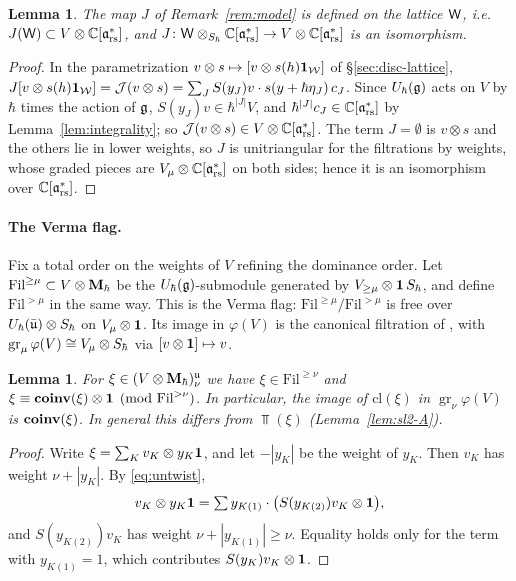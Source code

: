 \documentclass{article}
\theoremstyle{plain}
\newtheorem{lemma}[theorem]{Lemma}
\theoremstyle{definition}
\theoremstyle{remark}
\numberwithin{equation}{section}
\begin{document}
\begin{lemma}\label{lem:J-integral}
The map $J$ of Remark~\ref{rem:model} is defined on the lattice $\mathsf W$, i.e.\ $J(\mathsf W)\subset V\otimes\mathbb{C}[\mathfrak{a}^*_{\mathrm{rs}}]$, and $J\colon\mathsf W\otimes_{S_\hbar}\mathbb{C}[\mathfrak{a}^*_{\mathrm{rs}}]\to V\otimes\mathbb{C}[\mathfrak{a}^*_{\mathrm{rs}}]$ is an isomorphism.
\end{lemma}

\begin{proof}
In the parametrization $v\otimes s\mapsto[v\otimes s(h)\mathbf 1_{\mathcal{W}}]$ of \S\ref{sec:disc-lattice},
$J[v\otimes s(h)\mathbf 1_{\mathcal{W}}]=\mathcal J(v\otimes s)=\sum_JS(y_J)v\cdot s(y+\hbar\eta_J)\,c_J$. Since $U_\hbar(\mathfrak{g})$ acts on $V$ by $\hbar$ times the action of $\mathfrak{g}$, $S(y_J)v\in\hbar^{|J|}V$, and $\hbar^{|J|}c_J\in\mathbb{C}[\mathfrak{a}^*_{\mathrm{rs}}]$ by Lemma~\ref{lem:integrality}; so $\mathcal J(v\otimes s)\in V\otimes\mathbb{C}[\mathfrak{a}^*_{\mathrm{rs}}]$. The term $J=\emptyset$ is $v\otimes s$ and the others lie in lower weights, so $J$ is unitriangular for the filtrations by weights, whose graded pieces are $V_\mu\otimes\mathbb{C}[\mathfrak{a}^*_{\mathrm{rs}}]$ on both sides; hence it is an isomorphism over $\mathbb{C}[\mathfrak{a}^*_{\mathrm{rs}}]$.
\end{proof}

\paragraph{The Verma flag.}
Fix a total order on the weights of $V$ refining the dominance order. Let $\mathrm{Fil}^{\ge\mu}\subset V\otimes\mathbf{M}_\hbar$ be the $U_\hbar(\mathfrak{g})$-submodule generated by $V_{\ge\mu}\otimes\mathbf 1\,S_\hbar$, and define $\mathrm{Fil}^{>\mu}$ in the same way. This is the Verma flag: $\mathrm{Fil}^{\ge\mu}/\mathrm{Fil}^{>\mu}$ is free over $U_\hbar(\bar{\mathfrak u})\otimes S_\hbar$ on $V_\mu\otimes\mathbf 1$. Its image in $\varphi(V)$ is the canonical filtration of \cite[\S4.3, Lemma 6]{bezrukavnikov2026equivariantsatakecategorykostantwhittaker}, with $\operatorname{gr}_\mu\varphi(V)\cong V_\mu\otimes S_\hbar$ via $[v\otimes\mathbf 1]\mapsto v$.

\begin{lemma}\label{lem:flag}
For $\xi\in(V\otimes\mathbf{M}_\hbar)^{\mathfrak{u}}_\nu$ we have $\xi\in\mathrm{Fil}^{\ge\nu}$ and $\xi\equiv\operatorname{\mathbf{coinv}}(\xi)\otimes\mathbf 1\pmod{\mathrm{Fil}^{>\nu}}$. In particular, the image of $\mathrm{cl}(\xi)$ in $\operatorname{gr}_\nu\varphi(V)$ is $\operatorname{\mathbf{coinv}}(\xi)$. In general this differs from $\Top(\xi)$ (Lemma~\ref{lem:sl2-A}).
\end{lemma}

\begin{proof}
Write $\xi=\sum_Kv_K\otimes y_K\mathbf 1$, and let $-|y_K|$ be the weight of $y_K$. Then $v_K$ has weight $\nu+|y_K|$. By \eqref{eq:untwist},
\[
v_K\otimes y_K\mathbf 1=\textstyle\sum y_{K(1)}\cdot\bigl(S(y_{K(2)})v_K\otimes\mathbf 1\bigr),
\]
and $S(y_{K(2)})v_K$ has weight $\nu+|y_{K(1)}|\ge\nu$. Equality holds only for the term with $y_{K(1)}=1$, which contributes $S(y_K)v_K\otimes\mathbf 1$.
\end{proof}
\end{document}
